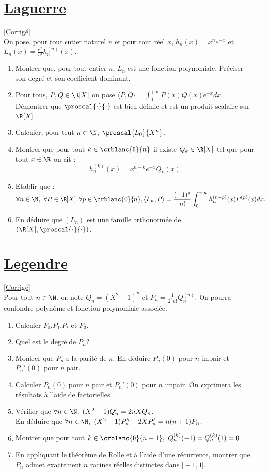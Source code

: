 \documentclass{book}
\begin{document}
	\section{\underline{Laguerre} }
	\textcolor{blue}{\hyperref[sec:Laguerre]{[Corrigé]}}\\
	\label{Laguerre}
	On pose, pour tout entier naturel $n$ et pour tout réel $x$, $h_n(x)=x^ne^{-x}$ et $L_n(x)=\displaystyle\frac{e^x}{n!}h_n^{(n)}(x)$.
	\begin{enumerate}[leftmargin=*]
		\item Montrer que, pour tout entier $n$, $L_n$ est une fonction polynomiale. Préciser son degré et son coefficient dominant.
		\item Pour tous, $P,Q\in\R[X]$ on pose $\langle P,Q \rangle = \displaystyle\int_0^{+\infty}P(x)Q(x)e^{-x}dx$.\\Démontrer que $\proscal{\cdot}{\cdot}$ est bien définie et est un produit scalaire sur $\R[X]$
		\item Calculer, pour tout $n\in\N$, $\proscal{L_0}{X^n}$.
		\item Montrer que pour tout $k\in\crblanc{0}{n}$ il existe $Q_k\in\R[X]$ tel que pour tout $x\in\R$ on ait :
		$$h_n^{(k)}(x)=x^{n-k}e^{-x}Q_k(x)$$
		\item Etablir que : $\forall n\in\N, \ \forall P\in\R[X], \forall p\in\crblanc{0}{n}, \langle L_n,P \rangle=\displaystyle\frac{(-1)^p}{n!}\int_0^{+\infty}h_n^{(n-p)}(x)P^{(p)}(x)dx.$
		\item En déduire que $(L_n)$ est une famille orthonormée de $(\R[X],\proscal{\cdot}{\cdot})$.
	\end{enumerate}
	
	\section{\underline{Legendre} }
	\textcolor{blue}{\hyperref[sec:Legendre]{[Corrigé]}}\\
	\label{Legendre}
	Pour tout $n\in\N$, on note $Q_n=(X^2-1)^n$ et $P_n=\displaystyle\frac{1}{2^nn!}Q_n^{(n)}$. On pourra confondre polynôme et fonction polynomiale associée.
	\begin{enumerate}[leftmargin=*]
		\item Calculer $P_0$,$P_1$,$P_2$ et $P_3$.
		\item Quel est le degré de $P_n$?
		\item Montrer que $P_n$ a la parité de $n$. En déduire $P_n(0)$ pour $n$ impair et $P_n'(0)$ pour $n$ pair.
		\item Calculer $P_n(0)$ pour $n$ pair et $P_n'(0)$ pour $n$ impair. On exprimera les résultats à l'aide de factorielles.
		\item Vérifier que $\forall  n\in\N,\ (X^2-1)Q_n'=2nXQ_n$.\\
		En déduire que $\forall n \in\N,\ (X^2-1)P_n''+2XP_n'=n(n+1)P_n$.
		\item Montrer que pour tout $k\in\crblanc{0}{n-1},\ Q_n^{(k)}(-1)=Q_n^{(k)}(1)=0$.
		\item En appliquant le théorème de Rolle et à l'aide d'une récurrence, montrer que $P_n$ admet exactement $n$ racines réelles distinctes dans $]-1,1[$.
	\end{enumerate}
	
\end{document}
